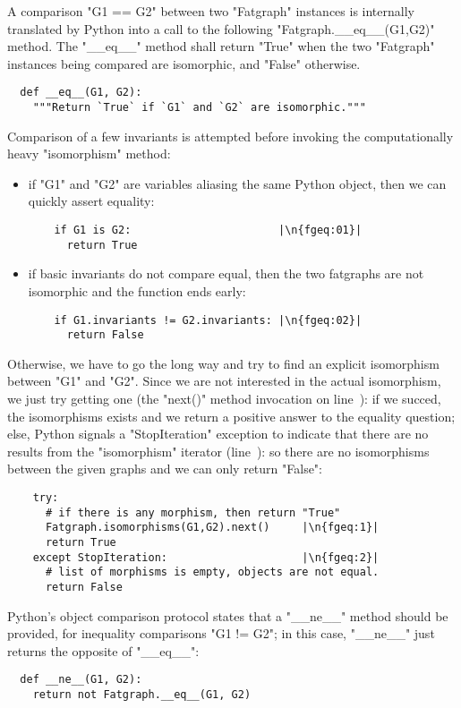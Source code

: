 A comparison "G1 == G2" between two "Fatgraph" instances is internally
translated by Python into a call to the following
"Fatgraph.__eq__(G1,G2)" method.  The "__eq__" method shall return
"True" when the two "Fatgraph" instances being compared are
isomorphic, and "False" otherwise.
\begin{lstlisting}
  def __eq__(G1, G2):
    """Return `True` if `G1` and `G2` are isomorphic."""

\end{lstlisting}
Comparison of a few invariants is attempted before invoking the
computationally heavy "isomorphism" method:
\begin{itemize}
\item if "G1" and "G2" are variables aliasing the same Python object,
  then we can quickly assert equality:
\begin{lstlisting}
    if G1 is G2:                       |\n{fgeq:01}|
      return True
\end{lstlisting}
\item if basic invariants do not compare equal, then the two fatgraphs
  are not isomorphic and the function ends early:
\begin{lstlisting}
    if G1.invariants != G2.invariants: |\n{fgeq:02}|
      return False

\end{lstlisting}
\end{itemize}
Otherwise, we have to go the long way and try to find an explicit
isomorphism between "G1" and "G2".  Since we are not interested in the
actual isomorphism, we just try getting one (the "next()" method
invocation on line~): if we succed, the isomorphisms exists
and we return a positive answer to the equality question; else, Python
signals a "StopIteration" exception to indicate that there are no
results from the "isomorphism" iterator (line~): so there
are no isomorphisms between the given graphs and we can only return
"False":
\begin{lstlisting}
    try:
      # if there is any morphism, then return "True"
      Fatgraph.isomorphisms(G1,G2).next()     |\n{fgeq:1}|
      return True
    except StopIteration:                     |\n{fgeq:2}|
      # list of morphisms is empty, objects are not equal.
      return False

\end{lstlisting}
Python's object comparison protocol states that a "__ne__" method
should be provided, for inequality comparisons "G1 != G2"; in this
case, "__ne__" just returns the opposite of "__eq__":
\begin{lstlisting}
  def __ne__(G1, G2):
    return not Fatgraph.__eq__(G1, G2)
\end{lstlisting}


